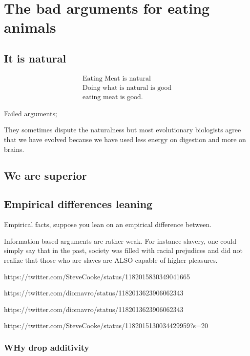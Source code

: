 
\chapter{The bad arguments for eating animals}

\section{It is natural}

\begin{align}
\text{Eating Meat is natural} \\
\text{Doing what is natural is good} \\
\text{eating meat is good.}
\end{align}

Failed arguments;


They sometimes dispute the naturalness but most evolutionary biologists agree that we have evolved because we have used less energy on digestion and more on brains.  

\section{We are superior}

\section{Empirical differences leaning}
Empirical facts, suppose you lean on an empirical difference between. 

Information based arguments are rather weak. For instance slavery, one could simply say that in the past, society was filled with racial prejudices and did not realize that those who are slaves are ALSO capable of higher pleasures. 


https://twitter.com/SteveCooke/status/1182015830349041665

https://twitter.com/diomavro/status/1182013623906062343

https://twitter.com/diomavro/status/1182013623906062343

https://twitter.com/SteveCooke/status/1182015130034429959?s=20

\subsection{WHy drop additivity}

